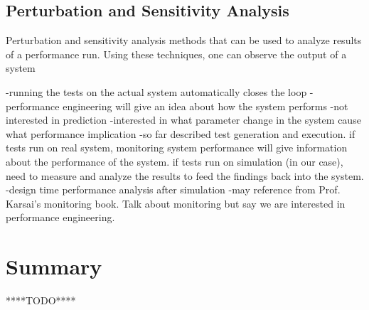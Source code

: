 \subsection{Perturbation and Sensitivity Analysis}
Perturbation and sensitivity analysis methods that can be used to analyze results of a performance run. Using these techniques, one can observe the output of a system

-running the tests on the actual system automatically closes the loop
-performance engineering will give an idea about how the system performs
-not interested in prediction
-interested in what parameter change in the system cause what performance implication
-so far described test generation and execution. if tests run on real system, monitoring system performance will give information about the performance of the system. if tests run on simulation (in our case), need to measure and analyze the results to feed the findings back into the system. 
-design time performance analysis after simulation
-may reference from Prof. Karsai's monitoring book. Talk about monitoring but say we are interested in performance engineering.


\section{Summary}
****TODO****